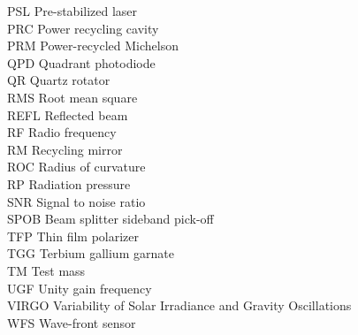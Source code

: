 \begin{tabbing}
PSL \> Pre-stabilized laser \\
PRC \> Power recycling cavity \\
PRM \> Power-recycled Michelson \\
QPD \> Quadrant photodiode \\
QR \> Quartz rotator \\
RMS \> Root mean square \\
REFL \> Reflected beam \\
RF \> Radio frequency \\
RM \> Recycling mirror \\
ROC \> Radius of curvature \\
RP \> Radiation pressure \\
SNR \> Signal to noise ratio \\
SPOB \> Beam splitter sideband pick-off \\
TFP \> Thin film polarizer \\
TGG \> Terbium gallium garnate \\
TM \> Test mass \\
UGF \> Unity gain frequency \\
VIRGO \> Variability of Solar Irradiance and Gravity Oscillations \\
WFS \> Wave-front sensor 
\end{tabbing}
